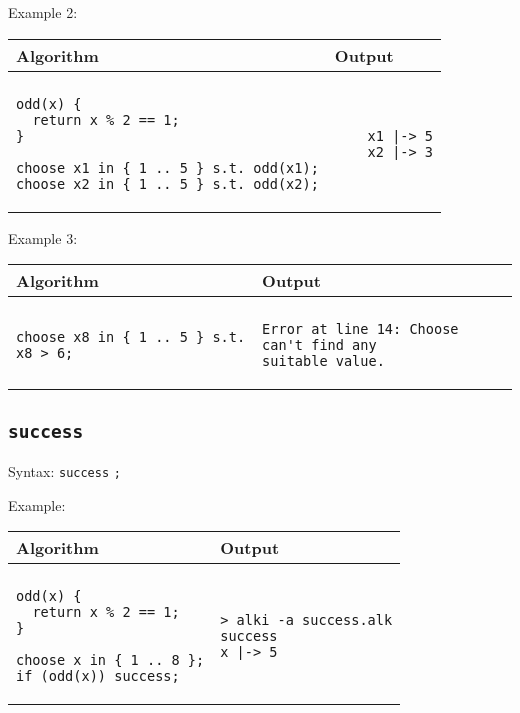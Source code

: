 \documentclass[a4paper]{report}
\begin{document}
Example 2:
\begin{center}
\begin{tabular}{ll}
Algorithm & Output\\
\hline
\\
\begin{minipage}{.45\textwidth}
\begin{verbatim}
odd(x) {
  return x % 2 == 1;
}

choose x1 in { 1 .. 5 } s.t. odd(x1);
choose x2 in { 1 .. 5 } s.t. odd(x2);
\end{verbatim}
\end{minipage}
&
\begin{minipage}{.45\textwidth}
\begin{verbatim}
    x1 |-> 5
    x2 |-> 3
\end{verbatim}
\end{minipage}
\end{tabular}
\end{center}

Example 3:
\begin{center}
\begin{tabular}{ll}
Algorithm & Output\\
\hline
\\
\begin{minipage}{.45\textwidth}
\begin{verbatim}
choose x8 in { 1 .. 5 } s.t. x8 > 6;
\end{verbatim}
\end{minipage}
&
\begin{minipage}{.45\textwidth}
\begin{verbatim}
Error at line 14: Choose can't find any
suitable value.
\end{verbatim}
\end{minipage}
\end{tabular}
\end{center}


\subsection{\texttt{success}}

Syntax: \verb"success" \verb";"

Example:
\begin{center}
\begin{tabular}{ll}
Algorithm & Output\\
\hline
\\
\begin{minipage}{.45\textwidth}
\begin{verbatim}
odd(x) {
  return x % 2 == 1;
}

choose x in { 1 .. 8 };
if (odd(x)) success;
\end{verbatim}
\end{minipage}
&
\begin{minipage}{.45\textwidth}
\begin{verbatim}
> alki -a success.alk
success
x |-> 5
\end{verbatim}
\end{minipage}
\end{tabular}
\end{center}
\end{document}
